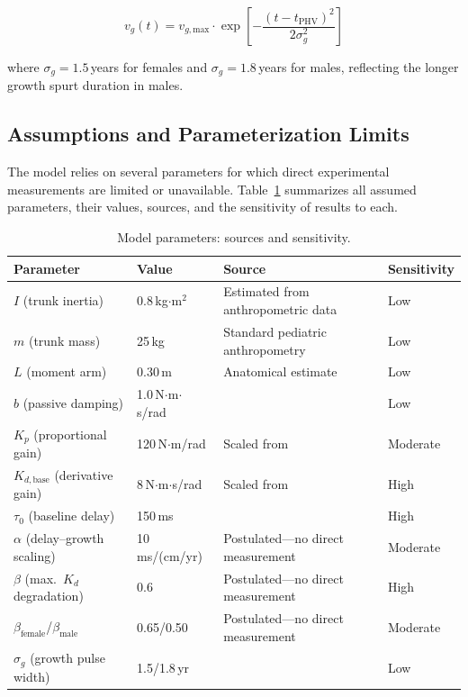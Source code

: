 \documentclass[12pt,a4paper]{article}
\begin{document}
\begin{equation}
v_g(t) = v_{g,\text{max}} \cdot \exp\left[-\frac{(t - t_{\text{PHV}})^2}{2\sigma_g^2}\right]
\label{eq:growth}
\end{equation}

\noindent where $\sigma_g = 1.5$\,years for females and $\sigma_g = 1.8$\,years for males, reflecting the longer growth spurt duration in males.

\subsection{Assumptions and Parameterization Limits}

The model relies on several parameters for which direct experimental measurements are limited or unavailable. Table~\ref{tab:assumptions} summarizes all assumed parameters, their values, sources, and the sensitivity of results to each.

\begin{table}[h]
\centering
\caption{Model parameters: sources and sensitivity.}
\label{tab:assumptions}
\small
\begin{tabular}{llll}
\toprule
\textbf{Parameter} & \textbf{Value} & \textbf{Source} & \textbf{Sensitivity} \\
\midrule
$I$ (trunk inertia) & 0.8\,kg$\cdot$m$^2$ & Estimated from anthropometric data & Low \\
$m$ (trunk mass) & 25\,kg & Standard pediatric anthropometry & Low \\
$L$ (moment arm) & 0.30\,m & Anatomical estimate & Low \\
$b$ (passive damping) & 1.0\,N$\cdot$m$\cdot$s/rad & \citep{winter1995human} & Low \\
$K_p$ (proportional gain) & 120\,N$\cdot$m/rad & Scaled from \citep{peterka2002sensorimotor} & Moderate \\
$K_{d,\text{base}}$ (derivative gain) & 8\,N$\cdot$m$\cdot$s/rad & Scaled from \citep{peterka2002sensorimotor} & High \\
$\tau_0$ (baseline delay) & 150\,ms & \citep{peterka2002sensorimotor, winter1995human} & High \\
$\alpha$ (delay--growth scaling) & 10\,ms/(cm/yr) & Postulated---no direct measurement & Moderate \\
$\beta$ (max.\ $K_d$ degradation) & 0.6 & Postulated---no direct measurement & High \\
$\beta_{\text{female}}$/$\beta_{\text{male}}$ & 0.65/0.50 & Postulated---no direct measurement & Moderate \\
$\sigma_g$ (growth pulse width) & 1.5/1.8\,yr & \citep{tanner1966growth} & Low \\
\bottomrule
\end{tabular}
\end{table}
\end{document}
